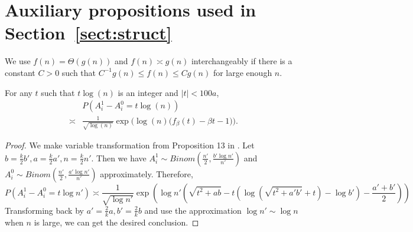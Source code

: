 \documentclass{article}
\begin{document}
\appendix

\section{Auxiliary propositions used in Section~\ref{sect:struct}}\label{ap:um}




We use $f(n)=\Theta(g(n))$ and $f(n)\asymp g(n)$ interchangeably if there is a constant $C>0$ such that $C^{-1}g(n)\le f(n)\le C g(n)$ for large enough $n$.

\begin{proposition}  \label{prop:99}
For any $t$ such that $t\log(n)$ is an integer and $|t|<100a$,
\begin{equation} \label{eq:ly}
\begin{aligned}
& P(A^1_i-A^0_i = t\log(n))  \\
\asymp & \frac{1} {\sqrt{\log(n)}} \exp\Big(\log(n)
\Big(f_{\beta}(t) - \beta t -1 \Big)\Big) .
\end{aligned}
\end{equation}
\end{proposition}


\begin{proof}
We make variable transformation from Proposition 13 in \cite{ye2020exact}.
Let $b = \frac{k}{2}b', a=\frac{k}{2}a', n = \frac{k}{2}n'$.
Then we have $A_i^1 \sim Binom(\frac{n'}{2}, \frac{b' \log n'}{n'})$ and 
$A_i^0 \sim Binom(\frac{n'}{2}, \frac{a' \log n'}{n'})$ approximately.
Therefore, 
$$
P(A_i^1 - A_i^0 = t \log n') \asymp \frac{1}{\sqrt{\log n'}} \exp(\log n'(\sqrt{t^2+ab} - t(\log(\sqrt{t^2+a'b'}+t)-\log b') - \frac{a'+b'}{2}))
$$
Transforming back by $a'=\frac{2}{k}a, b' = \frac{2}{k}b$ and use the approximation $\log n' \sim \log n$ when $n$ is large, we can get the desired
conclusion.
\end{proof}
\end{document}
